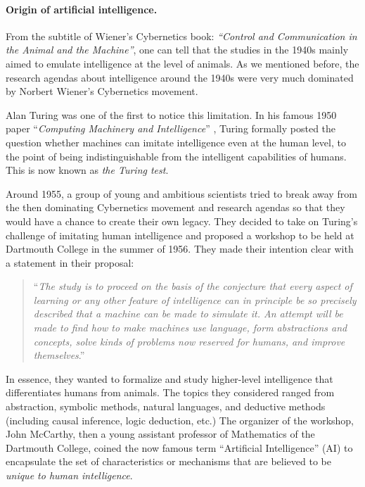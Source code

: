 \documentclass[../../book-main.tex]{subfiles}
\begin{document}
\paragraph{Origin of artificial intelligence.}
From the subtitle of Wiener's Cybernetics book: {\em ``Control and Communication in the Animal and the Machine''}, one can tell that the studies in the 1940s mainly aimed to emulate intelligence at the level of animals. As we mentioned before, the research agendas about intelligence around the 1940s were very much dominated by Norbert Wiener's Cybernetics movement. 

Alan Turing was one of the first to notice this limitation. In his famous 1950 paper ``{\em Computing Machinery and Intelligence}'' \cite{Turing-1950}, Turing formally posted the question whether machines can imitate intelligence even at the human level, to the point of being indistinguishable from the intelligent capabilities of humans. This is now known as {\em the Turing test}. 

Around 1955, a group of young and ambitious scientists tried to break away from the then dominating Cybernetics movement and research agendas so that they would have a chance to create their own legacy. They decided to take on Turing's challenge of imitating human intelligence and proposed a workshop to be held at Dartmouth College in the summer of 1956. They made their intention clear with a statement in their proposal: 
\begin{quote}
    ``{\em The study is to proceed on the basis of the conjecture that every aspect of learning or any other feature of intelligence can in principle be so precisely described that a machine can be made to simulate it. An attempt will be made to find how to make machines use language, form abstractions and concepts, solve kinds of problems now reserved for humans, and improve themselves}.'' 
\end{quote}
In essence, they wanted to formalize and study higher-level intelligence that differentiates humans from animals. The topics they considered ranged from abstraction, symbolic methods, natural languages, and deductive methods (including causal inference, logic deduction, etc.) The organizer of the workshop, John McCarthy, then a young assistant professor of Mathematics of the Dartmouth College, coined the now famous term ``Artificial Intelligence'' (AI) to encapsulate the set of characteristics or mechanisms that are believed to be {\em unique to human intelligence}. 
\end{document}
